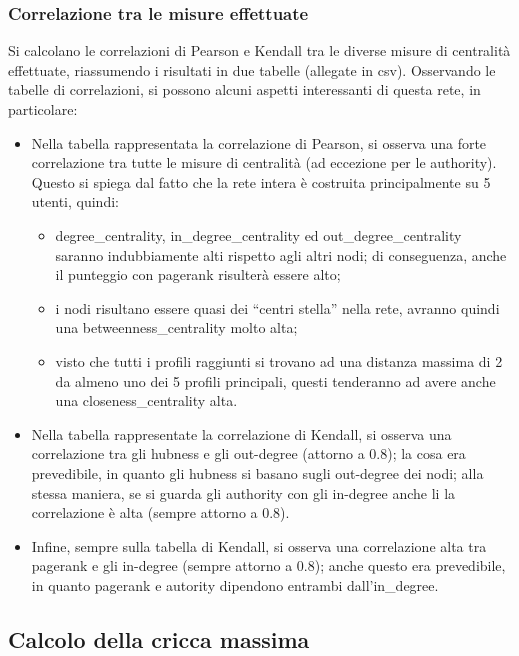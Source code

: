 \documentclass[a4paper, 12pt, twoside]{article}
\begin{document}
\subsubsection{Correlazione tra le misure effettuate}
Si calcolano le correlazioni di Pearson e Kendall  tra le diverse misure di centralità effettuate, riassumendo i risultati in due tabelle (allegate in csv). 
Osservando le tabelle di correlazioni, si possono alcuni aspetti interessanti di questa rete, in particolare:
\begin{itemize}
    \item Nella tabella rappresentata la correlazione di Pearson, si osserva una forte correlazione tra tutte le misure di centralità (ad eccezione per le authority). Questo si spiega dal fatto che la rete intera è costruita principalmente su 5 utenti, quindi:
        \begin{itemize}
            \item degree\_centrality, in\_degree\_centrality ed out\_degree\_centrality saranno indubbiamente alti rispetto agli altri nodi; di conseguenza, anche il punteggio con pagerank risulterà essere alto;
            \item i nodi risultano essere quasi dei “centri stella” nella rete, avranno quindi una betweenness\_centrality molto alta;
            \item visto che tutti i profili raggiunti si trovano ad una distanza massima di 2 da almeno uno dei 5 profili principali, questi tenderanno ad avere anche una closeness\_centrality alta.
    \end{itemize}
    \item Nella tabella rappresentate la correlazione di Kendall, si osserva una correlazione tra gli hubness e gli out-degree (attorno a 0.8); la cosa era prevedibile, in quanto gli hubness si basano sugli out-degree dei nodi; alla stessa maniera, se si guarda gli authority con gli in-degree anche li la correlazione è alta (sempre attorno a 0.8).
    \item Infine, sempre sulla tabella di Kendall, si osserva una correlazione alta tra pagerank e gli in-degree (sempre attorno a 0.8); anche questo era prevedibile, in quanto pagerank e autority dipendono entrambi dall’in\_degree.
\end{itemize}


\subsection{Calcolo della cricca massima}
\end{document}

